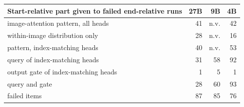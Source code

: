 \begin{tabular}{lrrr}
\toprule
Start-relative part given to failed end-relative runs & 27B & 9B & 4B \\
\midrule
image-attention pattern, all heads & 41 & n.v. & 42 \\
within-image distribution only & 28 & n.v. & 16 \\
pattern, index-matching heads & 40 & n.v. & 53 \\
query of index-matching heads & 31 & 58 & 92 \\
output gate of index-matching heads & 1 & 5 & 1 \\
query and gate & 28 & 60 & 93 \\
failed items & 87 & 85 & 76 \\
\bottomrule
\end{tabular}
